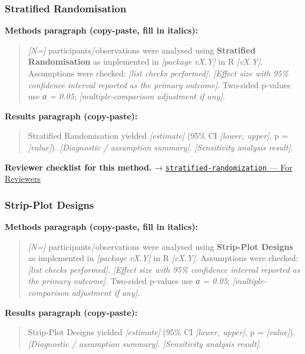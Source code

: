 \documentclass[
]{article}
\begin{document}
\subsubsection{Stratified Randomisation}\label{stratified-randomisation}

\textbf{Methods paragraph (copy-paste, fill in italics):}

\begin{quote}
\emph{{[}N={]}} participants/observations were analysed using
\textbf{Stratified Randomisation} as implemented in \emph{{[}package
vX.Y{]}} in R \emph{{[}vX.Y{]}}. Assumptions were checked: \emph{{[}list
checks performed{]}}. \emph{{[}Effect size with 95\% confidence interval
reported as the primary outcome{]}}. Two-sided p-values use \emph{α =
0.05}; \emph{{[}multiple-comparison adjustment if any{]}}.
\end{quote}

\textbf{Results paragraph (copy-paste):}

\begin{quote}
Stratified Randomisation yielded \emph{{[}estimate{]}} (95\% CI
\emph{{[}lower, upper{]}}, p = \emph{{[}value{]}}). \emph{{[}Diagnostic
/ assumption summary{]}}. \emph{{[}Sensitivity analysis result{]}}.
\end{quote}

\textbf{Reviewer checklist for this method.} →
\href{../chapters/14-clinical/stratified-randomization.Rmd\#for-reviewers}{\texttt{stratified-randomization}
--- For Reviewers}

\subsubsection{Strip-Plot Designs}\label{strip-plot-designs}

\textbf{Methods paragraph (copy-paste, fill in italics):}

\begin{quote}
\emph{{[}N={]}} participants/observations were analysed using
\textbf{Strip-Plot Designs} as implemented in \emph{{[}package vX.Y{]}}
in R \emph{{[}vX.Y{]}}. Assumptions were checked: \emph{{[}list checks
performed{]}}. \emph{{[}Effect size with 95\% confidence interval
reported as the primary outcome{]}}. Two-sided p-values use \emph{α =
0.05}; \emph{{[}multiple-comparison adjustment if any{]}}.
\end{quote}

\textbf{Results paragraph (copy-paste):}

\begin{quote}
Strip-Plot Designs yielded \emph{{[}estimate{]}} (95\% CI
\emph{{[}lower, upper{]}}, p = \emph{{[}value{]}}). \emph{{[}Diagnostic
/ assumption summary{]}}. \emph{{[}Sensitivity analysis result{]}}.
\end{quote}
\end{document}
